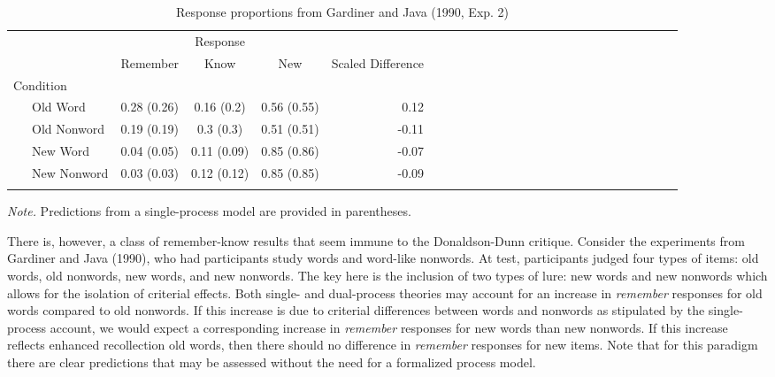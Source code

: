 \documentclass[english,,man]{apa6}
\begin{document}
\begin{table}[b]
\begin{center}
\begin{threeparttable}
\caption{\label{tab:tab2}Response proportions from Gardiner and Java (1990, Exp. 2)}
\begin{tabular}{lcccrlcccrlcccrlcccrlcccr}
\toprule
 & \multicolumn{3}{c}{Response}  &\\
\cmidrule(r){2-4}
 & \multicolumn{1}{c}{Remember} & \multicolumn{1}{c}{Know} & \multicolumn{1}{c}{New} & \multicolumn{1}{c}{Scaled Difference}\\
\midrule
Condition &  &  &  & \\
\ \ \ Old Word & 0.28 (0.26) & 0.16 (0.2) & 0.56 (0.55) & 0.12\\
\ \ \ Old Nonword & 0.19 (0.19) & 0.3 (0.3) & 0.51 (0.51) & -0.11\\
\ \ \ New Word & 0.04 (0.05) & 0.11 (0.09) & 0.85 (0.86) & -0.07\\
\ \ \ New Nonword & 0.03 (0.03) & 0.12 (0.12) & 0.85 (0.85) & -0.09\\
\bottomrule
\addlinespace
\end{tabular}
\begin{tablenotes}[para]
\normalsize{\textit{Note.} Predictions from a single-process model are provided in parentheses.}
\end{tablenotes}
\end{threeparttable}
\end{center}
\end{table}

There is, however, a class of remember-know results that seem immune to the Donaldson-Dunn critique. Consider the experiments from Gardiner and Java (1990), who had participants study words and word-like nonwords. At test, participants judged four types of items: old words, old nonwords, new words, and new nonwords.
The key here is the inclusion of two types of lure: new words and new nonwords which allows for the isolation of criterial effects. Both single- and dual-process theories may account for an increase in \emph{remember} responses for old words compared to old nonwords. If this increase is due to criterial differences between words and nonwords as stipulated by the single-process account, we would expect a corresponding increase in \emph{remember} responses for new words than new nonwords. If this increase reflects enhanced recollection old words, then there should no difference in \emph{remember} responses for new items. Note that for this paradigm there are clear predictions that may be assessed without the need for a formalized process model.
\end{document}
